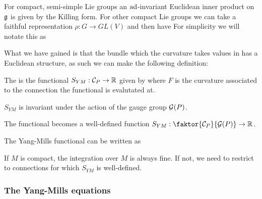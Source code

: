 \documentclass{article}
\begin{document}
\begin{remark}
For compact, semi-simple Lie groups an $\operatorname{ad}$-invariant Euclidean inner product on $\mathfrak{g}$ is given by the Killing form. For other compact Lie groups we can take a faithful representation $\rho : G \to GL(V)$ and then have 
For simplicity we will notate this as 
\end{remark}

What we have gained is that the bundle which the curvature takes values in has a Euclidean structure, as such we can make the following definition:

\begin{definition}
	The  is the functional $S_{YM}:\mathcal{C}_P \to \mathbb{R}$ given by 
where $F$ is the curvature associated to the connection the functional is evalutated at. 
\end{definition}

\begin{lemma}
	$S_{YM}$ is invariant under the action of the gauge group $\mathcal{G}(P)$. 
\end{lemma}

\begin{corollary}
	The functional becomes a well-defined function $S_{YM} : \faktor{\mc{C}_P}{\mc{G}(P)} \to \mbb{R}$. 
\end{corollary}

\begin{lemma}
	The Yang-Mills functional can be written as
\end{lemma}

\begin{remark}
	If $M$ is compact, the integration over $M$ is always fine. If not, we need to restrict to connections for which $S_{YM}$ is well-defined. 
\end{remark}

\subsubsection{The Yang-Mills equations}
\end{document}
